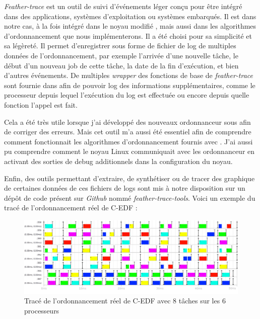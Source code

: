 \textit{Feather-trace} \cite{brandenburg2007feather} est un outil de suivi d'événements léger conçu pour être intégré dans des applications, systèmes d'exploitation ou systèmes embarqués. Il est dans notre cas, à la fois intégré dans le noyau modifié \litmus, mais aussi dans les algorithmes d'ordonnancement que nous implémenterons. Il a été choisi pour sa simplicité et sa légèreté. Il permet d'enregistrer sous forme de fichier de log de multiples données de l'ordonnancement, par exemple l'arrivée d'une nouvelle tâche, le début d'un nouveau job de cette tâche, la date de la fin d'exécution, et bien d'autres événements. De multiples \textit{wrapper} des fonctions de base de \textit{feather-trace} sont fournie dans \litmus afin de pouvoir log des informations supplémentaires, comme le processeur depuis lequel l'exécution du log est effectuée ou encore depuis quelle fonction l'appel est fait.

Cela a été très utile lorsque j'ai développé des nouveaux ordonnanceur sous \litmus afin de corriger des erreurs. Mais cet outil m'a aussi été essentiel afin de comprendre comment fonctionnait les algorithmes d'ordonnancement fournis avec \litmus. J'ai aussi pu comprendre comment le noyau Linux communiquait avec les ordonnanceur en activant des sorties de debug additionnels dans la configuration du noyau.

Enfin, des outils permettant d'extraire, de synthétiser ou de tracer des graphique de certaines données de ces fichiers de logs sont mis à notre disposition sur un dépôt de code présent sur \textit{Github} nommé \textit{feather-trace-tools}. Voici un exemple du tracé de l'ordonnancement réel de C-EDF :

\begin{figure}[H]
     \centering
     \includegraphics[width=\textwidth]{Images/schedule_host=rock960_scheduler=C-EDF_trace=C-EDF-OFFSET.png}
     \caption{Tracé de l'ordonnancement réel de C-EDF avec 8 tâches sur les 6 processeurs}
     \label{fig:trace-cedf}
\end{figure}


